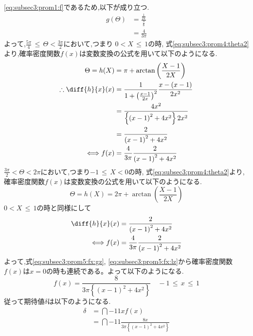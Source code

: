 \documentclass[dvipdfmx,titlepage, 11pt, a4paper]{jsarticle}%
\begin{document}
\begin{enumerate}[(1)]
  \eqref{eq:subsec3:prom1:f}であるため,以下が成り立つ.
  \begin{align*}
    g(\Theta) &= \frac{\frac{1}{2\pi}}{\frac{3}{8}}\\
              &= \frac{4}{3\pi}
  \end{align*}
  よって,$\frac{5\pi}{4}\, \leq\, \Theta < \frac{3\pi}{2}$において,つまり $0 < X\, \leq\, 1$の時,
  式\eqref{eq:subsec3:prom4:theta2}より,確率密度関数$f(x)$は変数変換の公式を用いて以下のようになる.
  \begin{align}
    \Theta = h(X) &= \pi + \arctan\left(\frac{X - 1}{2X}\right) \nonumber\\
    \therefore \diff{h}{x}(x) &= \frac{1}{1 + \left(\frac{x - 1}{2x}\right)^2}\frac{x - (x - 1)}{2x^2}\nonumber\\
                  &= \frac{4x^2}{\left\{\left(x - 1\right)^2 + 4x^2\right\}2x^2}\nonumber\\
                  &= \frac{2}{\left(x - 1\right)^2 + 4x^2}\nonumber\\
    \Longleftrightarrow f(x) &= \frac{4}{3\pi}\frac{2}{\left(x - 1\right)^2 + 4x^2}\label{eq:subsec3:prom5:fx:gz}
  \end{align}
  $\frac{3\pi}{2} < \Theta < 2\pi$において,つまり$-1\, \leq\, X < 0$の時,
  式\eqref{eq:subsec3:prom4:theta2}より,確率密度関数$f(x)$は変数変換の公式を用いて以下のようになる.
  \begin{equation*}
    \Theta = h(X) = 2\pi + \arctan\left(\frac{X - 1}{2X}\right)
  \end{equation*}
  $0 < X\, \leq\, 1$の時と同様にして
  \begin{align}
    \diff{h}{x}(x) &= \frac{2}{\left(x - 1\right)^2 + 4x^2}\nonumber\\
    \Longleftrightarrow f(x) &= \frac{4}{3\pi}\frac{2}{\left(x - 1\right)^2 + 4x^2}\label{eq:subsec3:prom5:fx:lz}
  \end{align}
  よって,式\eqref{eq:subsec3:prom5:fx:gz}, \eqref{eq:subsec3:prom5:fx:lz}から確率密度関数$f(x)$は$x=0$の時も連続である。よって以下のようになる.
  \begin{equation*}
    f(x) = \frac{8}{3\pi\left\{\left(x - 1\right)^2 + 4x^2\right\}}\quad -1\, \leq\,  x\, \leq\, 1
  \end{equation*}
  従って期待値$\delta$は以下のようになる.
  \begin{align*}
    \delta &= \dint{-1}{1}{xf(x)}\\
          &= \dint{-1}{1}{\frac{8x}{3\pi\left\{\left(x - 1\right)^2 + 4x^2\right\}}}\\

\end{align*}
\end{enumerate}
\end{document}
